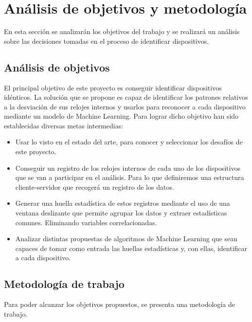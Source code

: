 
\chapter{Análisis de objetivos y metodología} \label{chap:meto}

En esta sección se analizarán los objetivos del trabajo y se realizará un análisis sobre las decisiones tomadas en el proceso de identificar dispositivos.

\section{Análisis de objetivos}

El principal objetivo de este proyecto es conseguir identificar dispositivos idénticos. La solución que se propone es capaz de identificar los patrones relativos a la desviación de sus relojes internos y usarlos para reconocer a cada dispositivo mediante un modelo de Machine Learning. Para lograr dicho objetivo han sido establecidas diversas metas intermedias:

\begin{itemize}
    \item Usar lo visto en el estado del arte, para conocer y seleccionar los desafíos de este proyecto.
    \item Conseguir un registro de los relojes internos de cada uno de los dispositivos que se van a participar en el análisis. Para lo que definiremos una estructura cliente-servidor que recogerá un registro de los datos.
    \item Generar una huella estadística de estos registros mediante el uso de una ventana deslizante que permite agrupar los datos y extraer estadísticas comunes. Eliminando variables correlacionadas.
    \item Analizar distintas propuestas de algoritmos de Machine Learning que sean capaces de tomar como entrada las huellas estadísticas y, con ellas, identificar a cada dispositivo.
\end{itemize}

\section{Metodología de trabajo}

Para poder alcanzar los objetivos propuestos, se presenta una metodología de trabajo.

